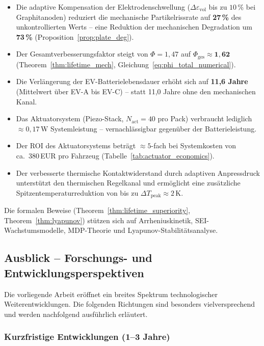 ﻿\documentclass[12pt,a4paper]{article}
\begin{document}
	\begin{itemize}[leftmargin=*]
		\item Die adaptive Kompensation der Elektrodenschwellung ($\Delta \varepsilon_\mathrm{vol}$
		bis zu $10\,\%$ bei Graphitanoden) reduziert die mechanische
		Partikelrissrate auf \textbf{27\,\%} des unkontrollierten Werts
		-- eine Reduktion der mechanischen Degradation um \textbf{73\,\%}
		(Proposition~\ref{prop:plate_deg}).
		\item Der Gesamtverbesserungsfaktor steigt von $\Phi = 1{,}47$ auf
		$\Phi_\mathrm{ges} \approx \mathbf{1{,}62}$ (Theorem~\ref{thm:lifetime_mech},
		Gleichung~\eqref{eq:phi_total_numerical}).
		\item Die Verlängerung der EV-Batterielebensdauer erhöht sich auf
		\textbf{11{,}6 Jahre} (Mittelwert über EV-A bis EV-C) -- statt
		11{,}0 Jahre ohne den mechanischen Kanal.
		\item Das Aktuatorsystem (Piezo-Stack, $N_\mathrm{act} = 40$ pro Pack)
		verbraucht lediglich $\approx 0{,}17\,\mathrm{W}$ Systemleistung --
		vernachlässigbar gegenüber der Batterieleistung.
		\item Der ROI des Aktuatorsystems beträgt $\approx 5$-fach bei
		Systemkosten von ca.\ 380\,EUR pro Fahrzeug
		(Tabelle~\ref{tab:actuator_economics}).
		\item Der verbesserte thermische Kontaktwiderstand durch adaptiven
		Anpressdruck unterstützt den thermischen Regelkanal und ermöglicht
		eine zusätzliche Spitzentemperaturreduktion von bis zu
		$\Delta T_\mathrm{peak} \approx 2\,\mathrm{K}$.
	\end{itemize}
	
	Die formalen Beweise (Theorem~\ref{thm:lifetime_superiority},
	Theorem~\ref{thm:lyapunov}) stützen sich auf Arrheniuskinetik,
	SEI-Wachstumsmodelle, MDP-Theorie und Lyapunov-Stabilitätsanalyse.
	
	\subsection{Ausblick -- Forschungs- und Entwicklungsperspektiven}
	
	Die vorliegende Arbeit eröffnet ein breites Spektrum technologischer
	Weiterentwicklungen. Die folgenden Richtungen sind besonders vielversprechend
	und werden nachfolgend ausführlich erläutert.
	
	\subsubsection{Kurzfristige Entwicklungen (1--3 Jahre)}
	
\end{document}
